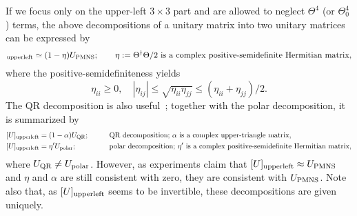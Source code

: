 \documentclass[CheatSheet]{subfiles}
\begin{document}
If we focus only on the upper-left $3\times3$ part and are allowed to neglect $\Theta^4$ (or $\Theta_0^4$) terms, the above decompositions of a unitary matrix into two unitary matrices~\cite{Blennow:2016jkn}
can be expressed by
\begin{equation}
 [U]\w{upper left} \simeq (1-\eta)U\w{PMNS};\qquad
  \text{$\eta:=\Theta^\dagger\Theta/2$ is a complex positive-semidefinite Hermitian matrix},
\end{equation}
where the positive-semidefiniteness yields
\begin{equation}
 \eta_{ii}\ge0,\quad |\eta_{ij}|\le\sqrt{\eta_{ii}\eta_{jj}}\le(\eta_{ii}+\eta_{jj})/2.
\end{equation}
The QR decomposition is also useful~\cite{Blennow:2016jkn}; together with the polar decomposition, it is summarized by
\begin{alignat}{2}
 [U]\w{upper left} &= (1-\alpha)U\w{QR};\qquad&
  &\text{QR decomposition; $\alpha$ is a complex upper-triangle matrix},\\
 [U]\w{upper left} &= \eta'U\w{polar};\qquad&
  &\text{polar decomposition; $\eta'$ is a complex positive-semidefinite Hermitian matrix},
\end{alignat}
where  $U\w{QR}\neq U\w{polar}$.
However, as experiments claim that $[U]\w{upper left} \approx U\w{PMNS}$ and $\eta$ and $\alpha$ are still consistent with zero, they are consistent with $U\w{PMNS}$.
Note also that, as $[U]\w{upper left}$ seems to be invertible, these decompositions are given uniquely.
\end{document}
